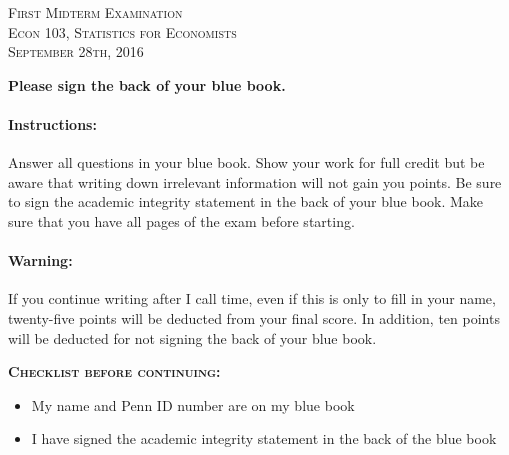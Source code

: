 \documentclass[addpoints,12pt]{exam}
\begin{document}
\begin{center}
	\textsc{\large First Midterm Examination\\ 
					  \normalsize Econ 103, Statistics for Economists \\ 
					  \vspace{0.5em} 
					  September 28th, 2016}
	
	\vspace{2em}
\end{center}

\begin{center}
        
        \vspace{2em}
        \textbf{Please sign the back of your blue book.}
\end{center}

\begin{center}
\gradetable[h][questions]
\end{center}

\paragraph{Instructions:} Answer all questions in your blue book. Show your work for full credit but be aware that writing down irrelevant information will not gain you points. Be sure to sign the academic integrity statement in the back of your blue book. Make sure that you have all pages of the exam before starting.

\paragraph{Warning:} If you continue writing after I call time, even if this is only to fill in your name, twenty-five points will be deducted from your final score. In addition, ten points will be deducted for not signing the back of your blue book.

\vspace{1em}
\textsc{\textbf{Checklist before continuing:}}
\begin{itemize}[label = $\square$, nolistsep]
	\item My name and Penn ID number are on my blue book
	\item I have signed the academic integrity statement in the back of the blue book
\end{itemize}
\end{document}

